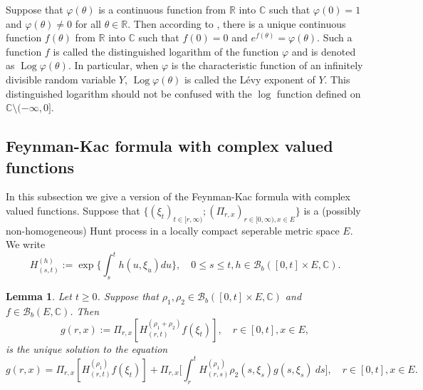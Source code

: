 \documentclass[12pt,a4paper]{amsart}
\theoremstyle{plain}
\newtheorem{lem}[thm]{Lemma}
\theoremstyle{definition}
\numberwithin{equation}{section}
\begin{document}
	Suppose that $\varphi(\theta)$ is a continuous function from $\mathbb R$ into $\mathbb C$ such that $\varphi(0) = 1$ and $\varphi(\theta) \neq 0$ for all $\theta \in \mathbb R$.
	Then according to \cite[Lemma 7.6]{Sato1999Levy}, there is a unique continuous function $f(\theta)$ from $\mathbb R$ into $\mathbb C$ such that $f(0) = 0$ and $e^{f(\theta)} = \varphi(\theta)$.
	Such a function $f$ is called the distinguished logarithm of the function $\varphi$ and is denoted as $\operatorname{Log} \varphi(\theta)$.
	In particular, when $\varphi$ is the characteristic function of an infinitely divisible random variable $Y$,  $\operatorname{Log} \varphi(\theta)$ is called the L\'evy exponent of $Y$.
 	This distinguished logarithm should not be confused with the $\log$ function defined on $\mathbb C\setminus (-\infty, 0]$.

\subsection{Feynman-Kac formula with complex valued functions}
\label{seq: complex Feynman-Kac transform}
    In this subsection we give a version of the Feynman-Kac formula with complex valued functions.
    Suppose that $\{(\xi_t)_{t \in [r,\infty)}; (\Pi_{r,x})_{r\in [0,\infty), x\in E}\}$ is a (possibly non-homogeneous) Hunt process in a locally compact seperable metric space $E$.
    We write
\begin{equation}
    H^{(h)}_{(s,t)}
    := \exp\Big\{\int_s^t h(u,\xi_u) du\Big\},
    \quad 0 \leq s \leq t, h \in \mathcal B_b([0,t] \times E,\mathbb C).
\end{equation}

\begin{lem}
    Let $t \geq 0$. Suppose that 
   $\rho_1, \rho_2\in \mathcal B_b([0,t] \times E, \mathbb C)$ 
    and $f\in \mathcal B_b(E, \mathbb C)$.
    Then
\begin{equation}
   g(r,x) := \Pi_{r,x}[ H_{(r,t)}^{(\rho_1+\rho_2)} f(\xi_t)],\quad r \in [0,t], x\in E,
\end{equation}
    is the unique solution to the equation
\[
    g(r,x)= \Pi_{r,x} [ H_{(r,t)}^{(\rho_1)} f(\xi_t)]+\Pi_{r,x} \Big[ \int_r^tH_{(r,s)}^{(\rho_1)}\rho_2(s,\xi_s) g(s,\xi_s)~ds \Big],\quad r \in [0,t], x\in E.
\]
\end{lem}
\end{document}
